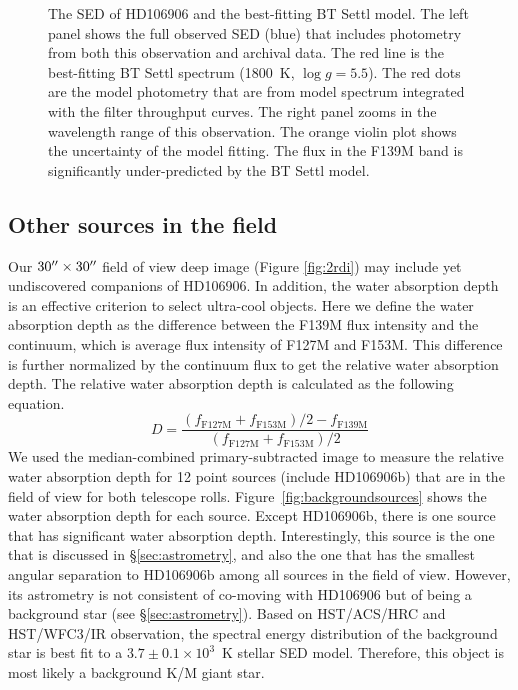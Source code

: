 \documentclass[twocolumn]{aastex62}
\begin{document}
\begin{figure}
  \centering
  \caption{The SED of HD106906 and the best-fitting BT Settl model. The left panel shows the full observed SED (blue) that includes photometry from both this observation and archival data. The red line is the best-fitting BT Settl spectrum (1800~K, $\log g=5.5$). The red dots are the model photometry that are from model spectrum integrated with the filter throughput curves. The right panel zooms in the wavelength range of this observation. The orange violin plot shows the uncertainty of the model fitting. The flux in the F139M band is significantly under-predicted by the BT Settl model.}
  \label{fig:SED}
\end{figure}

\subsection{Other sources in the field}
Our $30\mbox{$^{\prime\prime}$}\times30\mbox{$^{\prime\prime}$}$ field of view deep image (Figure \ref{fig:2rdi}) may include yet undiscovered companions of HD106906. In addition, the water absorption depth is an effective criterion to select ultra-cool objects. Here we define the water absorption depth as the difference between the F139M flux intensity and the continuum, which is average flux intensity of F127M and F153M. This difference is further normalized by the continuum flux to get the relative water absorption depth. The relative water absorption depth is calculated as the following equation.
\begin{equation}
D = \frac{(f_{\mathrm{F127M}} + f_\mathrm{F153M})/2 - f_{\mathrm{F139M}}}{(f_{\mathrm{F127M}} + f_\mathrm{{F153M}})/2}
\end{equation}
We used the median-combined primary-subtracted image to measure the relative water absorption depth for 12 point sources (include HD106906b) that are in the field of view for both telescope rolls. Figure~\ref{fig:backgroundsources} shows the water absorption depth for each source. Except HD106906b, there is one source that has significant water absorption depth. Interestingly, this source is the one that is discussed in \S\ref{sec:astrometry}, and also the one that has the smallest angular separation to HD106906b among all sources in the field of view. However, its astrometry is not consistent of co-moving with HD106906 but of being a background star (see \S\ref{sec:astrometry}). Based on HST/ACS/HRC and HST/WFC3/IR observation, the spectral energy distribution of the background star is best fit to a $3.7\pm0.1\times10^{3}$~K stellar SED model. Therefore, this object is most likely a background K/M giant star.
\end{document}
